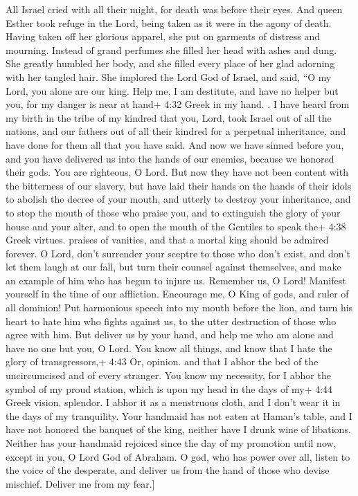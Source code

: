  All Israel cried with all their might, for death was
before their eyes.  And queen Esther took refuge in the
Lord, being taken as it were in the agony of death.  Having
taken off her glorious apparel, she put on garments of distress and
mourning. Instead of grand perfumes she filled her head with ashes and
dung. She greatly humbled her body, and she filled every place of her
glad adorning with her tangled hair.  She implored the Lord
God of Israel, and said, ``O my Lord, you alone are our king. Help me. I
am destitute, and have no helper but you,  for my danger is
near at hand+ 4:32 Greek in my hand. .  I have heard from
my birth in the tribe of my kindred that you, Lord, took Israel out of
all the nations, and our fathers out of all their kindred for a
perpetual inheritance, and have done for them all that you have said.
 And now we have sinned before you, and you have delivered
us into the hands of our enemies,  because we honored their
gods. You are righteous, O Lord.  But now they have not
been content with the bitterness of our slavery, but have laid their
hands on the hands of their idols  to abolish the decree of
your mouth, and utterly to destroy your inheritance, and to stop the
mouth of those who praise you, and to extinguish the glory of your house
and your alter,  and to open the mouth of the Gentiles to
speak the+ 4:38 Greek virtues. praises of vanities, and that a mortal
king should be admired forever.  O Lord, don't surrender
your sceptre to those who don't exist, and don't let them laugh at our
fall, but turn their counsel against themselves, and make an example of
him who has begun to injure us.  Remember us, O Lord!
Manifest yourself in the time of our affliction. Encourage me, O King of
gods, and ruler of all dominion!  Put harmonious speech
into my mouth before the lion, and turn his heart to hate him who fights
against us, to the utter destruction of those who agree with him.
 But deliver us by your hand, and help me who am alone and
have no one but you, O Lord.  You know all things, and know
that I hate the glory of transgressors,+ 4:43 Or, opinion. and that I
abhor the bed of the uncircumcised and of every stranger. 
You know my necessity, for I abhor the symbol of my proud station, which
is upon my head in the days of my+ 4:44 Greek vision. splendor. I abhor
it as a menstruous cloth, and I don't wear it in the days of my
tranquility.  Your handmaid has not eaten at Haman's table,
and I have not honored the banquet of the king, neither have I drunk
wine of libations.  Neither has your handmaid rejoiced
since the day of my promotion until now, except in you, O Lord God of
Abraham.  O god, who has power over all, listen to the
voice of the desperate, and deliver us from the hand of those who devise
mischief. Deliver me from my fear.{]}

